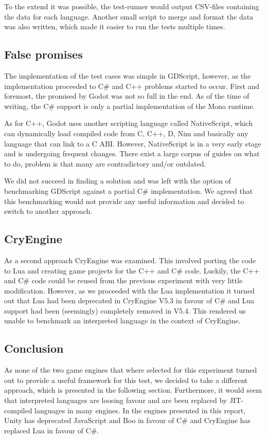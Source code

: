 To the extend it was possible, the test-runner would output \ac{CSV}-files containing the data for each language. Another small script to merge and format the data was also written, which made it easier to run the tests multiple times.

\subsection{False promises}
The implementation of the test cases was simple in GDScript, however, as the implementation proceeded to C\# and C++ problems started to occur. First and foremost, the \textit{} promised by Godot was not so full in the end. As of the time of writing, the C\# support is only a partial implementation of the Mono runtime.

As for C++, Godot uses another scripting language called NativeScript, which can dynamically load compiled code from C, C++, D, Nim and basically any language that can link to a C \ac{ABI}. However, NativeScript is in a very early stage and is undergoing frequent changes. There exist a large corpus of guides on what to do, problem is that many are contradictory and/or outdated.

We did not succeed in finding a solution and was left with the option of benchmarking GDScript against a partial C\# implementation. We agreed that this benchmarking would not provide any useful information and decided to switch to another approach.

\subsection{CryEngine}
As a second approach CryEngine was examined. This involved porting the code to Lua and creating game projects for the C++ and C\# code. Luckily, the C++ and C\# code could be reused from the previous experiment with very little modification. However, as we proceeded with the Lua implementation it turned out that Lua had been deprecated in CryEngine V5.3 in favour of C\# and Lua support had been (seemingly) completely removed in V5.4. This rendered us unable to benchmark an interpreted language in the context of CryEngine.

\subsection{Conclusion}
As none of the two game engines that where selected for this experiment turned out to provide a useful framework for this test, we decided to take a different approach, which is presented in the following section. Furthermore, it would seem that interpreted languages are loosing favour and are been replaced by \ac{JIT}-compiled languages in many engines. In the engines presented in this report, Unity has deprecated JavaScript and Boo in favour of C\# \cite{fine:unityscript, unity:boo} and CryEngine has replaced Lua in favour of C\#\cite{perkins:cryengine}.